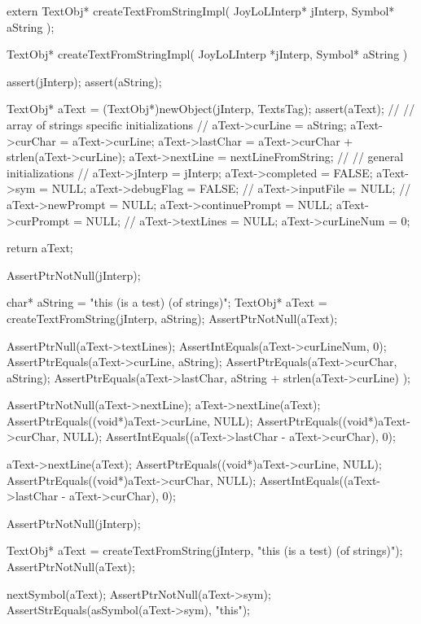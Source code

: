 \startCHeader
extern TextObj* createTextFromStringImpl(
  JoyLoLInterp* jInterp,
  Symbol* aString
);
\stopCHeader
{}

\startCCode
TextObj* createTextFromStringImpl(
  JoyLoLInterp *jInterp,
  Symbol* aString
) {
  assert(jInterp);
  assert(aString);
  
  TextObj* aText = (TextObj*)newObject(jInterp, TextsTag);
  assert(aText);
  //
  // array of strings specific initializations
  //
  aText->curLine   = aString;
  aText->curChar   = aText->curLine;
  aText->lastChar  = aText->curChar + strlen(aText->curLine);
  aText->nextLine  = nextLineFromString;
  //
  // general initializations
  //
  aText->jInterp   = jInterp;
  aText->completed = FALSE;
  aText->sym       = NULL;
  aText->debugFlag = FALSE;
  //
  aText->inputFile = NULL;
  //
  aText->newPrompt       = NULL;
  aText->continuePrompt  = NULL;
  aText->curPrompt       = NULL;
  //
  aText->textLines  = NULL;
  aText->curLineNum = 0;

  return aText;
}
\stopCCode

\startCTest
  AssertPtrNotNull(jInterp);

  char* aString = "this (is a test) (of strings)";
  TextObj* aText = createTextFromString(jInterp, aString);
  AssertPtrNotNull(aText);

  AssertPtrNull(aText->textLines);
  AssertIntEquals(aText->curLineNum, 0);
  AssertPtrEquals(aText->curLine, aString);
  AssertPtrEquals(aText->curChar, aString);
  AssertPtrEquals(aText->lastChar,
    aString + strlen(aText->curLine)
  );
  
  AssertPtrNotNull(aText->nextLine);
  aText->nextLine(aText);
  AssertPtrEquals((void*)aText->curLine, NULL);
  AssertPtrEquals((void*)aText->curChar, NULL);
  AssertIntEquals((aText->lastChar - aText->curChar), 0);

  aText->nextLine(aText);
  AssertPtrEquals((void*)aText->curLine, NULL);
  AssertPtrEquals((void*)aText->curChar, NULL);
  AssertIntEquals((aText->lastChar - aText->curChar), 0);
\stopCTest
\stopTestCase

\startCTest
  AssertPtrNotNull(jInterp);

  TextObj* aText =
    createTextFromString(jInterp, "this (is a test) (of strings)");
  AssertPtrNotNull(aText);

  nextSymbol(aText);
  AssertPtrNotNull(aText->sym);
  AssertStrEquals(asSymbol(aText->sym), "this");

